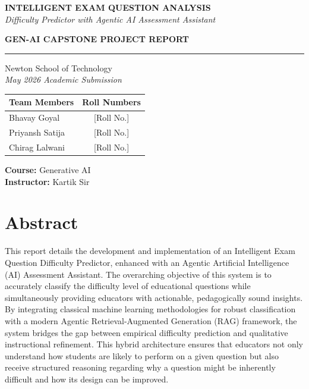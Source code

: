 \documentclass[12pt,a4paper]{article}
\begin{document}
\begin{titlepage}
    \centering
    \vspace*{1cm}
    {\Huge\bfseries\color{darkblue} INTELLIGENT EXAM QUESTION ANALYSIS} \\
    \vspace{0.5cm}
    {\large\itshape Difficulty Predictor with Agentic AI Assessment Assistant}

    \vspace{2cm}
    {\LARGE\bfseries GEN-AI CAPSTONE PROJECT REPORT}
    \vspace{0.5cm}
    \rule{0.8\textwidth}{0.5pt}

    \vspace{1.5cm}
    {\large Newton School of Technology\\[0.2em]
    \textit{May 2026 Academic Submission}}

    \vspace{1.5cm}
    \begin{tabular}{lc}
        \toprule
        \textbf{Team Members} & \textbf{Roll Numbers} \\
        \midrule
        Bhavay Goyal     & [Roll No.] \\
        Priyansh Satija  & [Roll No.] \\
        Chirag Lalwani   & [Roll No.] \\
        \bottomrule
    \end{tabular}

    \vspace{1.5cm}
    {\large \textbf{Course:} Generative AI\\[0.4em]
    \textbf{Instructor:} Kartik Sir}
    \vfill
\end{titlepage}

\section{Abstract}
This report details the development and implementation of an Intelligent Exam Question Difficulty Predictor, enhanced with an Agentic Artificial Intelligence (AI) Assessment Assistant. The overarching objective of this system is to accurately classify the difficulty level of educational questions while simultaneously providing educators with actionable, pedagogically sound insights. By integrating classical machine learning methodologies for robust classification with a modern Agentic Retrieval-Augmented Generation (RAG) framework, the system bridges the gap between empirical difficulty prediction and qualitative instructional refinement. This hybrid architecture ensures that educators not only understand how students are likely to perform on a given question but also receive structured reasoning regarding why a question might be inherently difficult and how its design can be improved.
\end{document}
